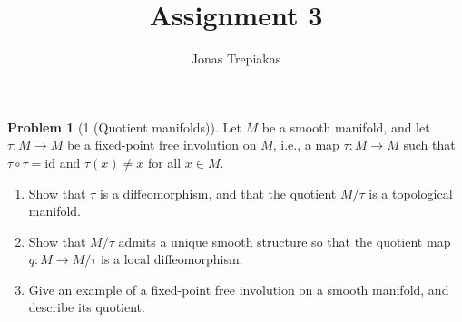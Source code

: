 \documentclass[reqno]{amsart}
\title{Assignment 3}
\author{Jonas Trepiakas}
\date{}
\theoremstyle{definition}
\newtheorem{problem}[theorem]{Problem}
\theoremstyle{remark}
\newcommand{\id}{{\mathrm{id}}}
\begin{document}
\maketitle
    \begin{problem}[1 (Quotient manifolds)]
        Let $M$ be a smooth manifold, and let 
        $\tau \colon M \to M$ be a fixed-point free
        involution on $M$, i.e., a map
        $\tau \colon M \to M$ such that
        $\tau \circ \tau = \id$ and $\tau (x) \neq x$ 
        for all $x \in M$.
        \begin{enumerate}
            \item Show that $\tau$ is a diffeomorphism, and
                that the quotient
                $M / \tau$ is a topological manifold.
            \item Show that $M / \tau$ admits a unique smooth
                structure so that the
                quotient map $q \colon M \to 
                M / \tau$ is a local diffeomorphism.
            \item Give an example of a fixed-point free involution
                on a smooth manifold, and describe its quotient.
        \end{enumerate}
    \end{problem}
\end{document}
